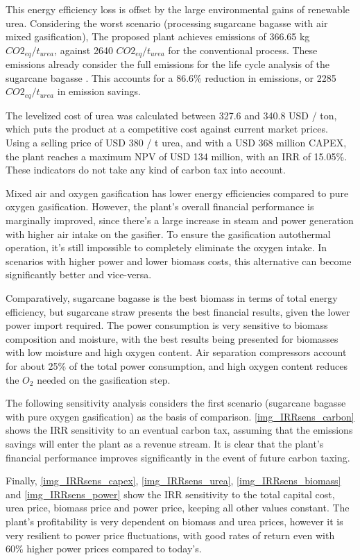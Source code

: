 \documentclass[a4paper, titlepage]{article}
\begin{document}
This energy efficiency loss is offset by the large environmental gains of renewable urea. Considering the worst scenario
(processing sugarcane bagasse with air mixed gasification), The proposed plant achieves emissions of 
366.65 kg $CO2_{eq} / t_{urea}$, against 2640 $CO2_{eq} / t_{urea}$ for the conventional process. These emissions already
consider the full emissions for the life cycle analysis of the sugarcane bagasse 
\cite{jonkerEconomicPerformanceGHG2019}. This accounts for a 86.6\% reduction in emissions, or 2285 $CO2_{eq} / t_{urea}$
in emission savings.

The levelized cost of urea was calculated between 327.6 and 340.8 USD / ton, which puts the product at a
competitive cost against current market prices. Using a selling price of USD 380 / t urea, and with a USD 368 
million CAPEX, the plant reaches a maximum NPV of USD 134 million, with an IRR of 15.05\%. These indicators do not take
any kind of carbon tax into account.

Mixed air and oxygen gasification has lower energy efficiencies compared to pure oxygen gasification. However, 
the plant's overall financial performance is marginally improved, since there's a large increase in steam and power
generation with higher air intake on the gasifier. To ensure the gasification autothermal operation, it's still
impossible to completely eliminate the oxygen intake. In scenarios with higher power and lower biomass costs, 
this alternative can become significantly better and vice-versa.

Comparatively, sugarcane bagasse is the best biomass in terms of total energy efficiency, but sugarcane straw presents
the best financial results, given the lower power import required. The power consumption is very sensitive to biomass
composition and moisture, with the best results being presented for biomasses with low moisture and high oxygen content.
Air separation compressors account for about 25\% of the total power consumption, and high oxygen content reduces
the $O_2$ needed on the gasification step.

The following sensitivity analysis considers the first scenario (sugarcane bagasse with pure oxygen gasification)
as the basis of comparison. \autoref{img_IRRsens_carbon} shows the IRR sensitivity to an eventual carbon tax, 
assuming that the emissions savings will enter the plant as a revenue stream.
It is clear that the plant’s financial performance improves significantly in the event of future carbon taxing.

Finally, \autoref{img_IRRsens_capex}, \autoref{img_IRRsens_urea}, \autoref{img_IRRsens_biomass} and
\autoref{img_IRRsens_power} show the IRR sensitivity to the total capital cost, urea price,
biomass price and power price, keeping all other values constant. The plant's profitability is very dependent on
biomass and urea prices, however it is very resilient to power price fluctuations, with good rates of return
even with 60\% higher power prices compared to today's.
\end{document}
